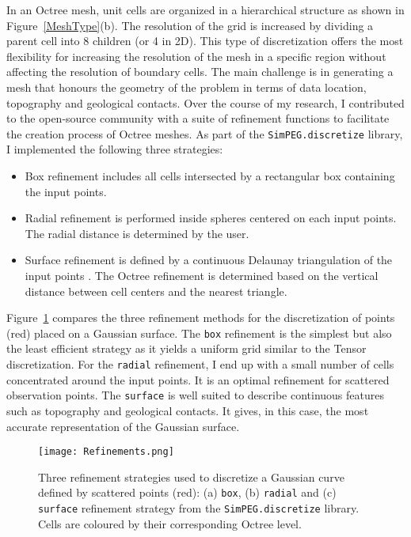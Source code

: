 In an Octree mesh, unit cells are organized in a hierarchical structure as shown in Figure~\ref{MeshType}(b). The resolution of the grid is increased by dividing a parent cell into 8 children (or 4 in 2D). This type of discretization offers the most flexibility for increasing the resolution of the mesh in a specific region without affecting the resolution of boundary cells.
The main challenge is in generating a mesh that honours the geometry of the problem in terms of data location, topography and geological contacts.
Over the course of my research, I contributed to the open-source community with a suite of refinement functions to facilitate the creation process of Octree meshes.
As part of the \texttt{SimPEG.discretize} library, I implemented the following three strategies:
\begin{itemize}
\item Box refinement includes all cells intersected by a rectangular box containing the input points.
\item Radial refinement is performed inside spheres centered on each input points. The radial distance is determined by the user.
\item Surface refinement is defined by a continuous Delaunay triangulation of the input points \cite[]{Barber1996}. The Octree refinement is determined based on the vertical distance between cell centers and the nearest triangle. 
\end{itemize}
Figure~\ref{Refinements} compares the three refinement methods for the discretization of points (red) placed on a  Gaussian surface. The \texttt{box} refinement is the simplest but also the least efficient strategy as it yields a uniform grid similar to the Tensor discretization. For the \texttt{radial} refinement, I end up with a small number of cells concentrated around the input points. It is an optimal refinement for scattered observation points. The \texttt{surface} is well suited to describe continuous features such as topography and geological contacts. It gives, in this case, the most accurate representation of the Gaussian surface.
\begin{figure}[h!]
{\centering
\texttt{[image: Refinements.png]}}
\caption{Three refinement strategies used to discretize a Gaussian curve defined by scattered points (red): (a) \texttt{box}, (b) \texttt{radial} and (c) \texttt{surface} refinement strategy from the \texttt{SimPEG.discretize} library. Cells are coloured by their corresponding Octree level.}
\label{Refinements}
\end{figure}

